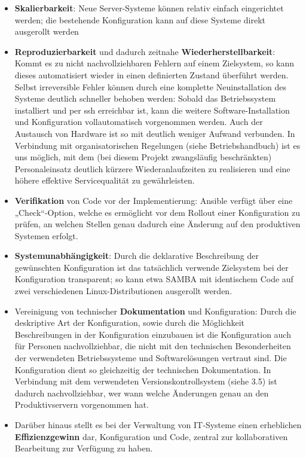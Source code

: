 \begin{itemize}
\item \textbf{Skalierbarkeit}: Neue Server-Systeme können relativ einfach eingerichtet werden; die bestehende Konfiguration kann auf diese Systeme direkt ausgerollt werden
\item \textbf{Reproduzierbarkeit} und dadurch zeitnahe \textbf{Wiederherstellbarkeit}: Kommt es zu nicht nachvollziehbaren Fehlern auf einem Zielsystem, so kann dieses automatisiert wieder in einen definierten Zustand überführt werden. Selbst irreversible Fehler können durch eine komplette Neuinstallation des Systeme deutlich schneller behoben werden: Sobald das Betriebssystem installiert und per ssh erreichbar ist, kann die weitere Software-Installation und Konfiguration vollautomatisch vorgenommen werden. Auch der Austausch von Hardware ist so mit deutlich weniger Aufwand verbunden. In Verbindung mit organisatorischen Regelungen (siehe Betriebshandbuch) ist es uns möglich, mit dem (bei diesem Projekt zwangsläufig beschränkten) Personaleinsatz deutlich kürzere Wiederanlaufzeiten zu realisieren und eine höhere effektive Servicequalität zu gewährleisten.
\item \textbf{Verifikation} von Code vor der Implementierung: Ansible verfügt über eine „Check“-Option, welche es ermöglicht vor dem Rollout einer Konfiguration zu prüfen, an welchen Stellen genau dadurch eine Änderung auf den produktiven Systemen erfolgt.
\item \textbf{Systemunabhängigkeit}: Durch die deklarative Beschreibung der gewünschten Konfiguration ist das tatsächlich verwende Zielsystem bei der Konfiguration transparent; so kann etwa SAMBA mit identischem Code auf zwei verschiedenen Linux-Distributionen ausgerollt werden.
\item Vereinigung von technischer \textbf{Dokumentation} und Konfiguration: Durch die deskriptive Art der Konfiguration, sowie durch die Möglichkeit Beschreibungen in der Konfiguration einzubauen ist die Konfiguration auch für Personen nachvollziehbar, die nicht mit den technischen Besonderheiten der verwendeten Betriebssysteme und Softwarelösungen vertraut sind. Die Konfiguration dient so gleichzeitig der technischen Dokumentation. In Verbindung mit dem verwendeten Versionskontrollsystem (siehe 3.5) ist dadurch nachvollziehbar, wer wann welche Änderungen genau an den Produktivservern vorgenommen hat.
\item Darüber hinaus stellt es bei der Verwaltung von IT-Systeme einen erheblichen \textbf{Effizienzgewinn} dar, Konfiguration und Code, zentral zur kollaborativen Bearbeitung zur Verfügung zu haben. 
\end{itemize}

